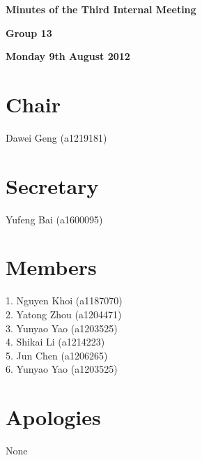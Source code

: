 \documentclass[11pt, a4paper]{article}
\begin{document}
 



\vspace*{15pt}

\begin{center}
\huge \bf Minutes of the Third Internal Meeting
\end{center}


\begin{center}
\Large \bf Group 13
\end{center}

\begin{center}
\Large \bf Monday 9th August 2012
\end{center}

\section*{Chair}
 Dawei Geng (a1219181)

\section*{Secretary}
Yufeng Bai (a1600095)

\section*{Members}
1. Nguyen Khoi (a1187070)\\
2. Yatong Zhou (a1204471)\\
3. Yunyao Yao (a1203525)\\
4. Shikai Li (a1214223)\\
5. Jun Chen (a1206265)\\
6. Yunyao Yao (a1203525)
\vspace*{10pt}

\section*{Apologies}
None
\end{document}
